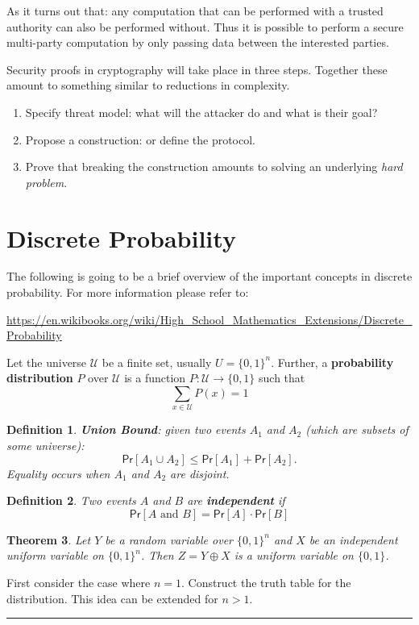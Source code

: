 \documentclass[twoside]{article}
\newcounter{lecnum}
\newtheorem{theorem}{Theorem}[lecnum]
\newtheorem{definition}[theorem]{Definition}
\newenvironment{proof}{{\bf Proof:}}{\hfill\rule{2mm}{2mm}}
\def\U{\mathcal{U}}
\def\Pr{\mathsf{Pr}}
\begin{document}
As it turns out that: any computation that can be performed with a trusted authority can also be performed without. Thus it is possible to perform a secure multi-party computation by only passing data between the interested parties.

Security proofs in cryptography will take place in three steps. Together these amount to something similar to reductions in complexity.
\begin{enumerate}
\item Specify threat model: what will the attacker do and what is their goal?
\item Propose a construction: or define the protocol.
\item Prove that breaking the construction amounts to solving an underlying \emph{hard problem}.
\end{enumerate} 

\section{Discrete Probability}
The following is going to be a brief overview of the important concepts in discrete probability. For more information please refer to:

\url{https://en.wikibooks.org/wiki/High_School_Mathematics_Extensions/Discrete_Probability}

Let the universe $\U$ be a finite set, usually $U = \{0,1\}^n$. Further, a \textbf{probability distribution} $P$ over $\U$ is a function $P: \U \rightarrow \{0,1\}$ such that
\[\sum_{x\in \U} P(x) = 1\]

\begin{definition}
\textbf{Union Bound}: given two events $A_1$ and $A_2$ (which are subsets of some universe):
\[\Pr[A_1 \cup A_2] \leq \Pr[A_1] + \Pr[A_2].\]
Equality occurs when $A_1$ and $A_2$ are disjoint.
\end{definition}

\begin{definition}
Two events $A$ and $B$ are \textbf{independent} if \[\Pr[A \mbox{ and } B] = \Pr[A] \cdot \Pr[B]\]
\end{definition}

\begin{theorem}
Let $Y$ be a random variable over $\{0,1\}^n$ and $X$ be an independent uniform variable on $\{0,1\}^n$. Then $Z = Y \oplus X$ is a uniform variable on $\{0,1\}$. 
\end{theorem}
\begin{proof}
First consider the case where $n = 1$. Construct the truth table for the distribution.  This idea can be extended for $n > 1$. 
\end{proof}
\end{document}
